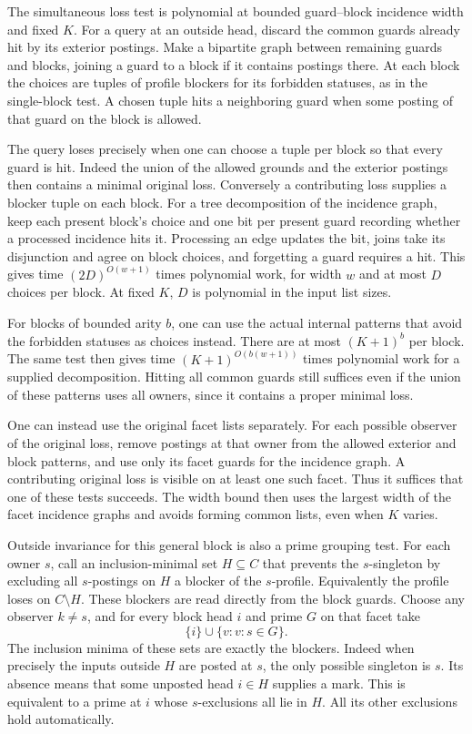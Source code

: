 The simultaneous loss test is polynomial at bounded
guard--block incidence width and fixed $K$. For a
query at an outside head, discard the common guards
already hit by its exterior postings. Make a
bipartite graph between remaining guards and blocks,
joining a guard to a block if it contains postings
there. At each block the choices are tuples of
profile blockers for its forbidden statuses, as in
the single-block test. A chosen tuple hits a
neighboring guard when some posting of that guard
on the block is allowed.

The query loses precisely when one can choose a
tuple per block so that every guard is hit. Indeed
the union of the allowed grounds and the exterior
postings then contains a minimal original loss.
Conversely a contributing loss supplies a blocker
tuple on each block. For a tree decomposition of
the incidence graph, keep each present block's
choice and one bit per present guard recording
whether a processed incidence hits it. Processing
an edge updates the bit, joins take its disjunction
and agree on block choices, and forgetting a guard
requires a hit. This gives time
$(2D)^{O(w+1)}$ times polynomial work, for width
$w$ and at most $D$ choices per block. At fixed $K$,
$D$ is polynomial in the input list sizes.

For blocks of bounded arity $b$, one can use the
actual internal patterns that avoid the forbidden
statuses as choices instead. There are at most
$(K+1)^b$ per block. The same test then gives time
$(K+1)^{O(b(w+1))}$ times polynomial work for a
supplied decomposition. Hitting all common guards
still suffices even if the union of these patterns
uses all owners, since it contains a proper
minimal loss.

One can instead use the original facet lists
separately. For each possible observer of the
original loss, remove postings at that owner from
the allowed exterior and block patterns, and use
only its facet guards for the incidence graph.
A contributing original loss is visible on at
least one such facet. Thus it suffices that one
of these tests succeeds. The width bound then
uses the largest width of the facet incidence
graphs and avoids forming common lists, even
when $K$ varies.

Outside invariance for this general block is also a
prime grouping test. For each owner $s$, call an
inclusion-minimal set $H\subseteq C$ that prevents the
$s$-singleton by excluding all $s$-postings on $H$
a blocker of the $s$-profile. Equivalently the
profile loses on $C\setminus H$. These blockers are
read directly from the block guards. Choose any
observer $k\ne s$, and for every block head $i$ and
prime $G$ on that facet take
\[
        \{i\}\cup\{v:v{:}s\in G\}.
\]
The inclusion minima of these sets are exactly the
blockers. Indeed when precisely the inputs outside
$H$ are posted at $s$, the only possible singleton
is $s$. Its absence means that some unposted head
$i\in H$ supplies a mark. This is equivalent to a
prime at $i$ whose $s$-exclusions all lie in $H$.
All its other exclusions hold automatically.

